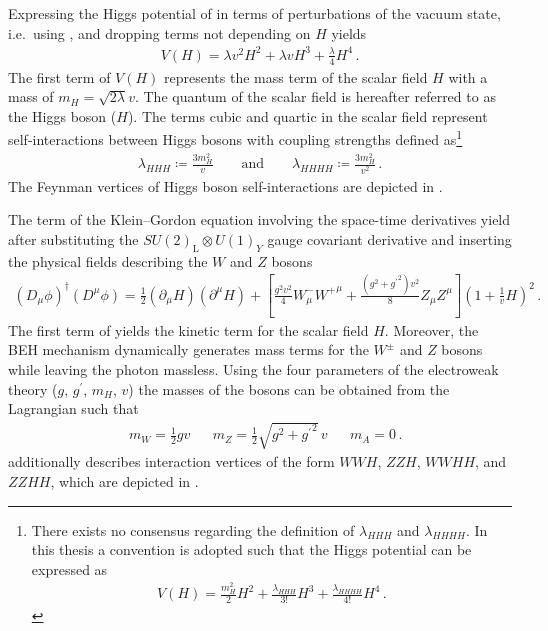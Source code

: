 Expressing the Higgs potential of  in terms of
perturbations of the vacuum state, i.e.\ using ,
and dropping terms not depending on $H$ yields
\begin{align}
  V(H) =
  \lambda v^2 H^2
  + \lambda v H^3
  + \frac{\lambda}{4} H^4 \,\text{.}
  \label{eq:beh_potential}
\end{align}
The first term of $V(H)$ represents the mass term of the scalar field $H$ with a
mass of $m_H = \sqrt{2\lambda} v$. The quantum of the scalar field is hereafter
referred to as the Higgs boson ($H$). The terms cubic and quartic in the scalar
field represent self-interactions between Higgs bosons with coupling strengths
defined as\footnote{There exists no consensus regarding the definition of
  $\lambda_{HHH}$ and $\lambda_{HHHH}$. In this thesis a convention is adopted
  such that the Higgs potential can be expressed as
  \begin{align*}
    V(H) = \frac{m_{H}^2}{2} H^2 + \frac{\lambda_{HHH}}{3!} H^3 + \frac{\lambda_{HHHH}}{4!}
    H^4 \,\text{.}
  \end{align*}
}
\begin{align*}
  \lambda_{HHH} \coloneqq \frac{3 m_{H}^2}{v} \qquad \text{and} \qquad \lambda_{HHHH} \coloneqq \frac{3 m_{H}^2}{v^2} \,\text{.}
\end{align*}
The Feynman vertices of Higgs boson self-interactions are depicted in
.

The term of the Klein--Gordon equation involving the space-time derivatives
yield after substituting the $SU(2)_{\text{L}} \otimes U(1)_Y$ gauge covariant
derivative and inserting the physical fields describing the $W$ and $Z$ bosons
\begin{align}
  (D_\mu \phi)^\dagger (D^\mu \phi) =
  \frac{1}{2} (\partial_\mu H) (\partial^\mu H)
  + \left[
  \frac{g^2 v^2}{4} W^{-}_\mu {W^{+}}^\mu
  +
  \frac{(g^2 + {g^\prime}^2) v^2}{8} Z_\mu Z^\mu
  \right] \left( 1 + \frac{1}{v} H \right)^2 \,\text{.}
  \label{eq:higgs_covariant_derivative}
\end{align}
The first term of  yields the kinetic term
for the scalar field $H$. Moreover, the BEH mechanism dynamically generates mass
terms for the $W^\pm$ and $Z$ bosons while leaving the photon massless. Using
the four parameters of the electroweak theory ($g$, $g^\prime$, $m_{H}$, $v$)
the masses of the bosons can be obtained from the Lagrangian such that
\begin{align*}
  &m_W = \frac{1}{2} g v  &&m_Z = \frac{1}{2} \sqrt{g^2 + {g^\prime}^2} \, v && m_A = 0 \,\text{.}
\end{align*}
 additionally describes interaction vertices
of the form $WWH$, $ZZH$, $WWHH$, and $ZZHH$, which are depicted in
.

